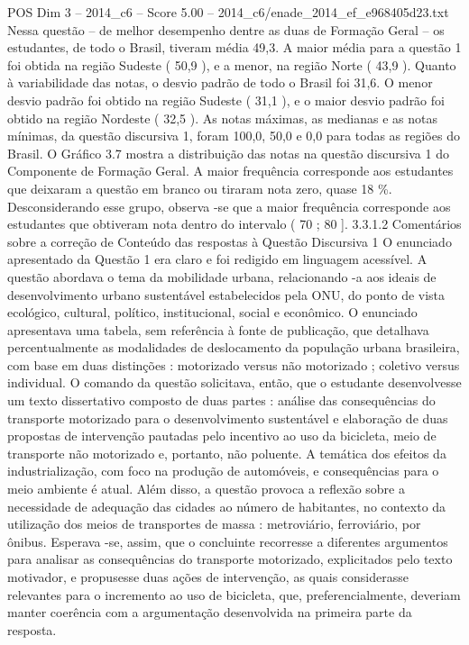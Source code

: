 \begin{textsample}{POS Dim 3 – 2014\_c6 – Score 5.00 – 2014\_c6/enade\_2014\_ef\_e968405d23.txt}
Nessa questão – de melhor desempenho dentre as duas de Formação Geral – os estudantes, de todo o Brasil, tiveram média 49,3.
A maior média para a questão 1 foi obtida na região Sudeste ( 50,9 ), e a menor, na região Norte ( 43,9 ).
Quanto à variabilidade das notas, o desvio padrão de todo o Brasil foi 31,6.
O menor desvio padrão foi obtido na região Sudeste ( 31,1 ), e o maior desvio padrão foi obtido na região Nordeste ( 32,5 ).
As notas máximas, as medianas e as notas mínimas, da questão discursiva 1, foram 100,0, 50,0 e 0,0 para todas as regiões do Brasil.
O Gráfico 3.7 mostra a distribuição das notas na questão discursiva 1 do Componente de Formação Geral.
A maior frequência corresponde aos estudantes que deixaram a questão em branco ou tiraram nota zero, quase 18 \%.
Desconsiderando esse grupo, observa -se que a maior frequência corresponde aos estudantes que obtiveram nota dentro do intervalo ( 70 ; 80 ]. 3.3.1.2 Comentários sobre a correção de Conteúdo das respostas à Questão Discursiva 1 O enunciado apresentado da Questão 1 era claro e foi redigido em linguagem acessível.
A questão abordava o tema da mobilidade urbana, relacionando -a aos ideais de desenvolvimento urbano sustentável estabelecidos pela ONU, do ponto de vista ecológico, cultural, político, institucional, social e econômico.
O enunciado apresentava uma tabela, sem referência à fonte de publicação, que detalhava percentualmente as modalidades de deslocamento da população urbana brasileira, com base em duas distinções : motorizado versus não motorizado ; coletivo versus individual.
O comando da questão solicitava, então, que o estudante desenvolvesse um texto dissertativo composto de duas partes : análise das consequências do transporte motorizado para o desenvolvimento sustentável e elaboração de duas propostas de intervenção pautadas pelo incentivo ao uso da bicicleta, meio de transporte não motorizado e, portanto, não poluente.
A temática dos efeitos da industrialização, com foco na produção de automóveis, e consequências para o meio ambiente é atual.
Além disso, a questão provoca a reflexão sobre a necessidade de adequação das cidades ao número de habitantes, no contexto da utilização dos meios de transportes de massa : metroviário, ferroviário, por ônibus.
Esperava -se, assim, que o concluinte recorresse a diferentes argumentos para analisar as consequências do transporte motorizado, explicitados pelo texto motivador, e propusesse duas ações de intervenção, as quais considerasse relevantes para o incremento ao uso de bicicleta, que, preferencialmente, deveriam manter coerência com a argumentação desenvolvida na primeira parte da resposta.

\end{textsample}

